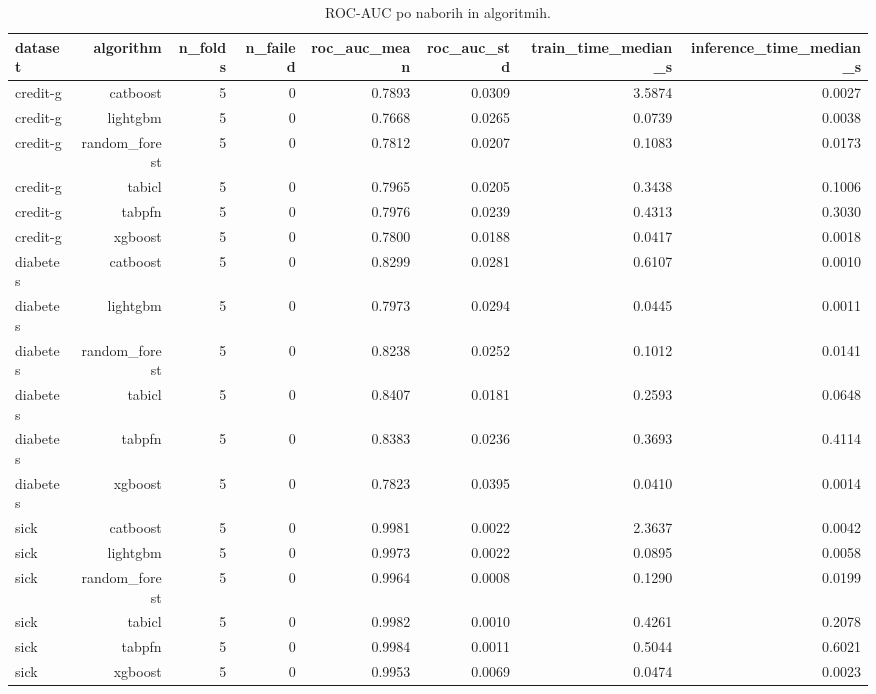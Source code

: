 \begin{table}[htbp]
\centering
\caption{ROC-AUC po naborih in algoritmih.}
\label{tab:per-dataset}
\begin{tabular}{lrrrrrrr}
\hline
dataset & algorithm & n\_folds & n\_failed & roc\_auc\_mean & roc\_auc\_std & train\_time\_median\_s & inference\_time\_median\_s \\
\hline
credit-g & catboost & 5 & 0 & 0.7893 & 0.0309 & 3.5874 & 0.0027 \\
credit-g & lightgbm & 5 & 0 & 0.7668 & 0.0265 & 0.0739 & 0.0038 \\
credit-g & random\_forest & 5 & 0 & 0.7812 & 0.0207 & 0.1083 & 0.0173 \\
credit-g & tabicl & 5 & 0 & 0.7965 & 0.0205 & 0.3438 & 0.1006 \\
credit-g & tabpfn & 5 & 0 & 0.7976 & 0.0239 & 0.4313 & 0.3030 \\
credit-g & xgboost & 5 & 0 & 0.7800 & 0.0188 & 0.0417 & 0.0018 \\
diabetes & catboost & 5 & 0 & 0.8299 & 0.0281 & 0.6107 & 0.0010 \\
diabetes & lightgbm & 5 & 0 & 0.7973 & 0.0294 & 0.0445 & 0.0011 \\
diabetes & random\_forest & 5 & 0 & 0.8238 & 0.0252 & 0.1012 & 0.0141 \\
diabetes & tabicl & 5 & 0 & 0.8407 & 0.0181 & 0.2593 & 0.0648 \\
diabetes & tabpfn & 5 & 0 & 0.8383 & 0.0236 & 0.3693 & 0.4114 \\
diabetes & xgboost & 5 & 0 & 0.7823 & 0.0395 & 0.0410 & 0.0014 \\
sick & catboost & 5 & 0 & 0.9981 & 0.0022 & 2.3637 & 0.0042 \\
sick & lightgbm & 5 & 0 & 0.9973 & 0.0022 & 0.0895 & 0.0058 \\
sick & random\_forest & 5 & 0 & 0.9964 & 0.0008 & 0.1290 & 0.0199 \\
sick & tabicl & 5 & 0 & 0.9982 & 0.0010 & 0.4261 & 0.2078 \\
sick & tabpfn & 5 & 0 & 0.9984 & 0.0011 & 0.5044 & 0.6021 \\
sick & xgboost & 5 & 0 & 0.9953 & 0.0069 & 0.0474 & 0.0023 \\
\hline
\end{tabular}
\end{table}
